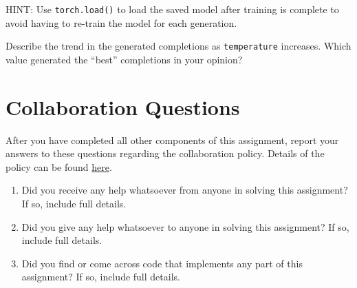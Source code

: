 \documentclass[11pt,addpoints,answers]{exam}
\begin{document}
\begin{questions}
\begin{parts}
\begin{subparts}
    HINT: Use \texttt{torch.load()} to load the saved model after training is complete to avoid having to re-train the model for each generation.
    
    \begin{your_solution}[title=\texttt{Temperature = 0}, height=3cm]
    \end{your_solution}
    
    \begin{your_solution}[title=\texttt{Temperature = 0.3}, height=3cm]
    \end{your_solution}
    
    \begin{your_solution}[title=\texttt{Temperature = 0.8}, height=3cm]
    \end{your_solution}


    \clearpage
    \subpart[1]Describe the trend in the generated completions as \texttt{temperature} increases. Which value generated the ``best'' completions in your opinion?

    \begin{your_solution}[height=4cm]
    \end{your_solution}
\end{subparts}

\end{parts}
    \newpage
    \end{questions}
\newpage
\section{Collaboration Questions}
After you have completed all other components of this assignment, report your answers to these questions regarding the collaboration policy. Details of the policy can be found \href{http://www.cs.cmu.edu/~mgormley/courses/10601/syllabus.html}{here}.
\begin{enumerate}
    \item Did you receive any help whatsoever from anyone in solving this assignment? If so, include full details.
    \item Did you give any help whatsoever to anyone in solving this assignment? If so, include full details.
    \item Did you find or come across code that implements any part of this assignment? If so, include full details.
\end{enumerate}

\begin{your_solution}[height=6cm]

\end{your_solution}
\end{document}
